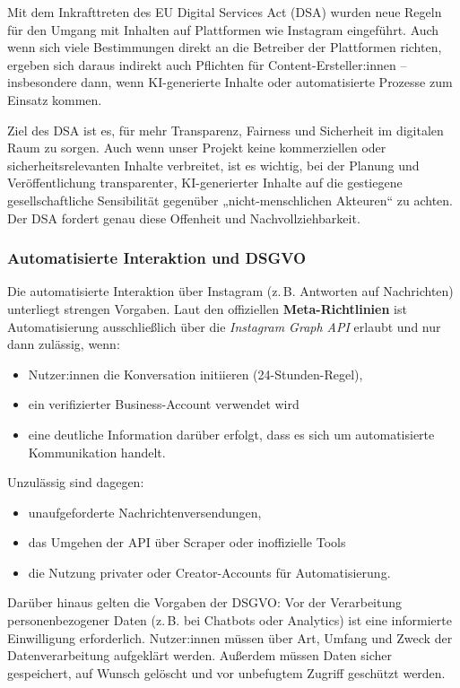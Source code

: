 \documentclass[a4paper,12pt]{article}
\begin{document}
Mit dem Inkrafttreten des EU Digital Services Act (DSA) wurden neue Regeln für den Umgang mit Inhalten auf Plattformen wie Instagram eingeführt. Auch wenn sich viele Bestimmungen direkt an die Betreiber der Plattformen richten, ergeben sich daraus indirekt auch Pflichten für Content-Ersteller:innen – insbesondere dann, wenn KI-generierte Inhalte oder automatisierte Prozesse zum Einsatz kommen.

Ziel des DSA ist es, für mehr Transparenz, Fairness und Sicherheit im digitalen Raum zu sorgen.
Auch wenn unser Projekt keine kommerziellen oder sicherheitsrelevanten Inhalte verbreitet, ist es wichtig, bei der Planung und Veröffentlichung transparenter, KI-generierter Inhalte auf die gestiegene gesellschaftliche Sensibilität gegenüber „nicht-menschlichen Akteuren“ zu achten. Der DSA fordert genau diese Offenheit und Nachvollziehbarkeit.

\subsubsection*{Automatisierte Interaktion und DSGVO}

Die automatisierte Interaktion über Instagram (z.\,B. Antworten auf Nachrichten) unterliegt strengen Vorgaben. Laut den offiziellen \textbf{Meta-Richtlinien} ist Automatisierung ausschließlich über die \textit{Instagram Graph API} erlaubt und nur dann zulässig, wenn:

\begin{itemize}
    \item Nutzer:innen die Konversation initiieren (24-Stunden-Regel),
    \item ein verifizierter Business-Account verwendet wird
    \item eine deutliche Information darüber erfolgt, dass es sich um automatisierte Kommunikation handelt.
\end{itemize}

Unzulässig sind dagegen:
\begin{itemize}
    \item unaufgeforderte Nachrichtenversendungen,
    \item das Umgehen der API über Scraper oder inoffizielle Tools
    \item die Nutzung privater oder Creator-Accounts für Automatisierung.
\end{itemize}

Darüber hinaus gelten die Vorgaben der DSGVO: Vor der Verarbeitung personenbezogener Daten (z.\,B. bei Chatbots oder Analytics) ist eine informierte Einwilligung erforderlich. Nutzer:innen müssen über Art, Umfang und Zweck der Datenverarbeitung aufgeklärt werden. Außerdem müssen Daten sicher gespeichert, auf Wunsch gelöscht und vor unbefugtem Zugriff geschützt werden.
\clearpage
\end{document}
